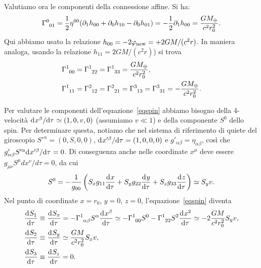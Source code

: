 Valutiamo ora le componenti della connessione affine.  Si ha:
\begin{equation}
  \tensor{\Gamma}{^{0}_{01}} =
  \frac{1}{2} \eta^{00} (\partial_1 h_{00} + \partial_0 h_{10}- \partial_0
  h_{01} ) =
  -  \frac{1}{2} \partial_1 h_{00} =   \frac {G M_{\oplus}} {c^2  r_0^2}.
\end{equation}
Qui abbiamo usato la relazione $h_{00}=-2 \phi_{\textup{new}} = + 2GM/(c^2 r)$.
In maniera analoga, usando la relazione $h_{11}=2GM/(c^2 r)$) si trova
\begin{subequations}
  \begin{align}
    \tensor{\Gamma}{^{1}_{00}} &= \tensor{\Gamma}{^{1}_{22}} =
    \tensor{\Gamma}{^{1}_{33}} = \frac{G M_{\oplus}}{c^2 r_0^2}, \\
    \tensor{\Gamma}{^{1}_{11}} &= \tensor{\Gamma}{^{2}_{12}} =
    \tensor{\Gamma}{^{2}_{21}} = \tensor{\Gamma}{^{3}_{13}} =
    \tensor{\Gamma}{^{3}_{31}} = -\frac{G M_{\oplus}}{c^2 r_0^2}.
  \end{align}
\end{subequations}

Per valutare le componenti dell'equazione~\eqref{eqspin} abbiamo bisogno della
4-velocità $\ltoder{x^{\beta}}{\tau} \simeq (1,0,v,0)$ (assumiamo $v\ll 1$) e
della componente $S^0$ dello spin.  Per determinare questa, notiamo che nel
sistema di riferimento di quiete del giroscopio $S'^{\alpha}=(0,S,0,0)$,
$\ltoder{x'^{\beta}}{\tau} = (1,0,0,0)$ e $g'_{\alpha \beta} = \eta_{\alpha
  \beta}$, così che $g'_{\alpha \beta} S'^{\alpha} \ltoder{x'^{\beta}}{\tau}
=0$.  Di conseguenza anche nelle coordinate $x^{\mu}$ deve essere $g_{\mu \nu}
S^{\mu} dx^{\nu}/d\tau =0$, da cui
\begin{equation}
  S^0 = - \frac{1}{g_{00}} \left( S_x g_{11} \toder{x}{\tau} + S_y g_{22}
    \toder{y}{\tau} + S_z g_{33} \toder{z}{\tau}\right) \simeq S_y v.
\end{equation}
Nel punto di coordinate $x=r_0$, $y=0$, $z=0$, l'equazione~\eqref{eqspin}
diventa
\begin{subequations}
  \begin{align}
    \toder{S_1}{\tau} &\equiv \toder{S_x}{\tau} =
                        -\tensor{\Gamma}{^1_{\alpha \beta}} S^{\alpha}
                        \toder{x^{\beta}}{\tau} \simeq
                        -\tensor{\Gamma}{^1_{00}} S^0  -
                        \tensor{\Gamma}{^1_{22}} S^2 \toder{x^2}{\tau} \simeq
                        -2 \frac{GM}{c^2 r_0^2} S_y v, \\
    \toder{S_2}{\tau} &\equiv \toder{S_y}{\tau} \simeq \frac{GM}{c^2 r_0^2} S_x
                        v, \\
    \toder{S_3}{\tau} &\equiv \toder{S_z}{\tau} = 0.
  \end{align}
\end{subequations}

